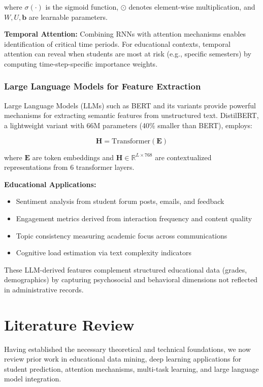 where $\sigma(\cdot)$ is the sigmoid function, $\odot$ denotes element-wise multiplication, and $W, U, \mathbf{b}$ are learnable parameters.

\textbf{Temporal Attention:} Combining RNNs with attention mechanisms enables identification of critical time periods. For educational contexts, temporal attention can reveal when students are most at risk (e.g., specific semesters) by computing time-step-specific importance weights.

\subsubsection{Large Language Models for Feature Extraction}

Large Language Models (LLMs) such as BERT and its variants provide powerful mechanisms for extracting semantic features from unstructured text. DistilBERT, a lightweight variant with 66M parameters (40\% smaller than BERT), employs:

\begin{equation}
\mathbf{H} = \text{Transformer}(\mathbf{E})
\end{equation}

where $\mathbf{E}$ are token embeddings and $\mathbf{H} \in \mathbb{R}^{L \times 768}$ are contextualized representations from 6 transformer layers.

\textbf{Educational Applications:}
\begin{itemize}
\item Sentiment analysis from student forum posts, emails, and feedback
\item Engagement metrics derived from interaction frequency and content quality
\item Topic consistency measuring academic focus across communications
\item Cognitive load estimation via text complexity indicators
\end{itemize}

These LLM-derived features complement structured educational data (grades, demographics) by capturing psychosocial and behavioral dimensions not reflected in administrative records.

\section{Literature Review}

Having established the necessary theoretical and technical foundations, we now review prior work in educational data mining, deep learning applications for student prediction, attention mechanisms, multi-task learning, and large language model integration.

